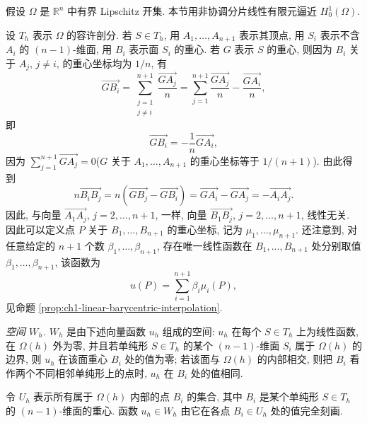 假设 $\Omega$ 是 $\mathbb R^n$ 中有界 Lipschitz 开集. 本节用非协调分片线性有限元逼近 $H_0^1(\Omega)$.

设 $T_h$ 表示 $\Omega$ 的容许剖分. 若 $S\in T_h$, 用 $A_1,\ldots,A_{n+1}$ 表示其顶点, 用 $S_i$ 表示不含 $A_i$ 的 $(n-1)$-维面, 用 $B_i$ 表示面 $S_i$ 的重心. 若 $G$ 表示 $S$ 的重心, 则因为 $B_i$ 关于 $A_j$, $j\neq i$, 的重心坐标均为 $1/n$, 有
\begin{equation}
\overrightarrow{GB_i}
=\sum_{\substack{j=1\\j\neq i}}^{n+1}\frac{\overrightarrow{GA_j}}{n}
=\sum_{j=1}^{n+1}\frac{\overrightarrow{GA_j}}{n}
-\frac{\overrightarrow{GA_i}}{n},
\label{eq:ch1-nc-barycenter-vector}
\end{equation}
即
\begin{equation}
\overrightarrow{GB_i}=-\frac1n\overrightarrow{GA_i},
\label{eq:ch1-nc-opposite-barycenter}
\end{equation}
因为 $\sum_{j=1}^{n+1}\overrightarrow{GA_j}=0$($G$ 关于 $A_1,\ldots,A_{n+1}$ 的重心坐标等于 $1/(n+1)$). 由此得到
\begin{equation}
n\overrightarrow{B_iB_j}
=n(\overrightarrow{GB_j}-\overrightarrow{GB_i})
=\overrightarrow{GA_i}-\overrightarrow{GA_j}
=-\overrightarrow{A_iA_j}.
\label{eq:ch1-nc-face-barycenter-difference}
\end{equation}
因此, 与向量 $\overrightarrow{A_1A_j}$, $j=2,\ldots,n+1$, 一样, 向量 $\overrightarrow{B_1B_j}$, $j=2,\ldots,n+1$, 线性无关. 因此可以定义点 $P$ 关于 $B_1,\ldots,B_{n+1}$ 的重心坐标, 记为 $\mu_1,\ldots,\mu_{n+1}$. 还注意到, 对任意给定的 $n+1$ 个数 $\beta_1,\ldots,\beta_{n+1}$, 存在唯一线性函数在 $B_1,\ldots,B_{n+1}$ 处分别取值 $\beta_1,\ldots,\beta_{n+1}$, 该函数为
\begin{equation}
u(P)=\sum_{i=1}^{n+1}\beta_i\mu_i(P),
\label{eq:ch1-nc-face-barycenter-interpolation}
\end{equation}
见命题 \ref{prop:ch1-linear-barycentric-interpolation}.

\emph{空间 $W_h$.} $W_h$ 是由下述向量函数 $u_h$ 组成的空间: $u_h$ 在每个 $S\in T_h$ 上为线性函数, 在 $\Omega(h)$ 外为零, 并且若单纯形 $S\in T_h$ 的某个 $(n-1)$-维面 $S_i$ 属于 $\Omega(h)$ 的边界, 则 $u_h$ 在该面重心 $B_i$ 处的值为零; 若该面与 $\Omega(h)$ 的内部相交, 则把 $B_i$ 看作两个不同相邻单纯形上的点时, $u_h$ 在 $B_i$ 处的值相同.

令 $U_h$ 表示所有属于 $\Omega(h)$ 内部的点 $B_i$ 的集合, 其中 $B_i$ 是某个单纯形 $S\in T_h$ 的 $(n-1)$-维面的重心. 函数 $u_h\in W_h$ 由它在各点 $B_i\in U_h$ 处的值完全刻画.

